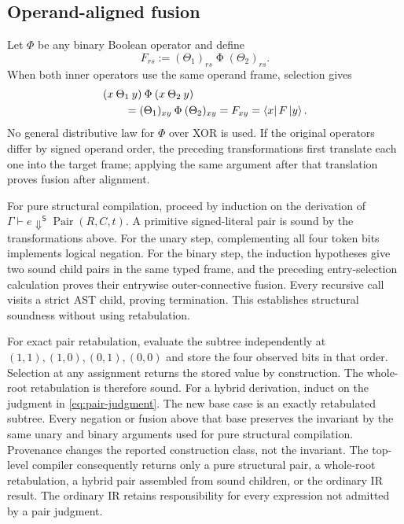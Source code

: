 \subsection{Operand-aligned fusion}

Let $\Phi$ be any binary Boolean operator and define
\begin{equation}
  F_{rs}:=(\Theta_1)_{rs}\mathbin{\Phi}(\Theta_2)_{rs}.
\end{equation}
When both inner operators use the same operand frame, selection gives
\begin{align}
 &(x\mathbin{\Theta_1}y)\mathbin{\Phi}
   (x\mathbin{\Theta_2}y) \\
 &\qquad=(\Theta_1)_{xy}\mathbin{\Phi}(\Theta_2)_{xy}
 =F_{xy}
 =\left\langle x\right|F\left|y\right\rangle.
\end{align}
No general distributive law for $\Phi$ over XOR is used. If the original
operators differ by signed operand order, the preceding transformations first
translate each one into the target frame; applying the same argument after
that translation proves fusion after alignment.

For pure structural compilation, proceed by induction on the derivation of
$\Gamma\vdash e\Downarrow^{\mathsf S}\operatorname{Pair}(R,C,t)$. A primitive
signed-literal pair is sound by the transformations above. For the unary step,
complementing all four token bits implements logical negation. For the binary
step, the induction hypotheses give two sound child pairs in the same typed
frame, and the preceding entry-selection calculation proves their entrywise
outer-connective fusion. Every recursive call visits a strict AST child,
proving termination. This establishes structural soundness without using
retabulation.

For exact pair retabulation, evaluate the subtree independently at
$(1,1),(1,0),(0,1),(0,0)$ and store the four observed bits in that order.
Selection at any assignment returns the stored value by construction. The
whole-root retabulation is therefore sound. For a hybrid derivation, induct on
the judgment in \eqref{eq:pair-judgment}. The new base case is an exactly
retabulated subtree. Every negation or fusion above that base preserves the
invariant by the same unary and binary arguments used for pure structural
compilation. Provenance changes the reported construction class, not the
invariant. The top-level compiler consequently returns only a pure structural
pair, a whole-root retabulation, a hybrid pair assembled from sound children,
or the ordinary IR result. The ordinary IR retains responsibility for every
expression not admitted by a pair judgment.

